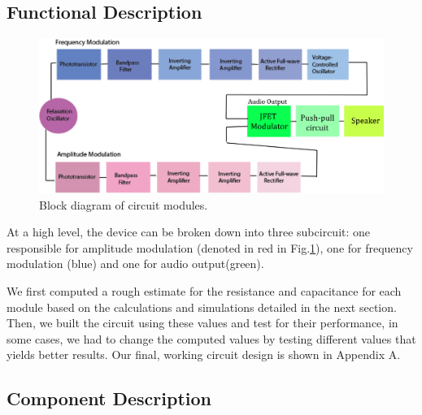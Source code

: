 \documentclass[twocolumn]{article}
\begin{document}
\subsection{Functional Description}
\begin{figure}
 \centering
\includegraphics[width=450pt]{figure/block}
\caption{Block diagram of circuit modules. }
\label{block}
\end{figure}
\par At a high level, the device can be broken down into three subcircuit: one responsible for amplitude modulation (denoted in red in Fig.\ref{block}), one for frequency modulation (blue) and one for audio output(green). 
\par We first computed a rough estimate for the resistance and capacitance for each module based on the calculations and simulations detailed in the next section. Then, we built the circuit using these values and test for their performance, in some cases, we had to change the computed values by testing different values that yields better results. Our final, working circuit design is shown in Appendix A.
\subsection{Component Description}
\end{document}
